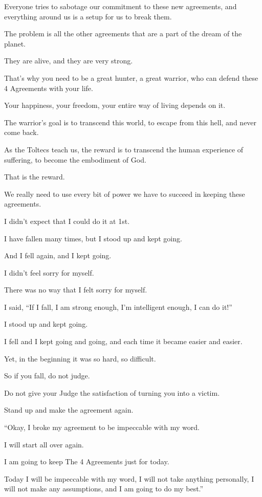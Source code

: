 \documentclass{article}
\numberwithin{equation}{section}
\begin{document}
Everyone tries to sabotage our commitment to these new agreements, and everything around us is a setup for us to break them.

The problem is all the other agreements that are a part of the dream of the planet.

They are alive, and they are very strong.

%
That's why you need to be a great hunter, a great warrior, who can defend these 4 Agreements with your life.

Your happiness, your freedom, your entire way of living depends on it.

The warrior's goal is to transcend this world, to escape from this hell, and never come back.

As the Toltecs teach us, the reward is to transcend the human experience of suffering, to become the embodiment of God.

That is the reward.

%
We really need to use every bit of power we have to succeed in keeping these agreements.

I didn't expect that I could do it at 1st.

I have fallen many times, but I stood up and kept going.

And I fell again, and I kept going.

I didn't feel sorry for myself.

There was no way that I felt sorry for myself.

I said, ``If I fall, I am strong enough, I'm intelligent enough, I can do it!''

I stood up and kept going.

I fell and I kept going and going, and each time it became easier and easier.

Yet, in the beginning it was so hard, so difficult.

%
So if you fall, do not judge.

Do not give your Judge the satisfaction of turning you into a victim.


Stand up and make the agreement again.

``Okay, I broke my agreement to be impeccable with my word.

I will start all over again.

I am going to keep The 4 Agreements just for today.

Today I will be impeccable with my word, I will not take anything personally, I will not make any assumptions, and I am going to do my best.''
\end{document}
